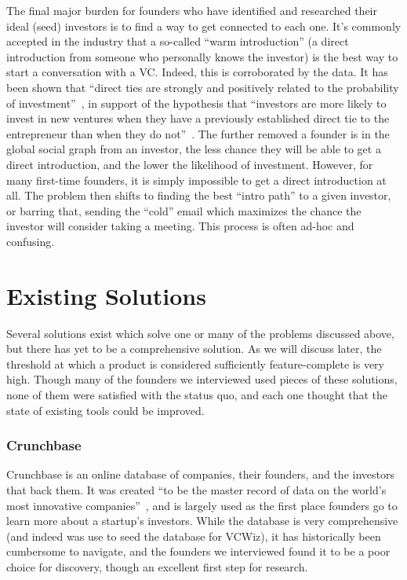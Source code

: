 The final major burden for founders who have identified and researched their ideal (seed) investors is to find a way to get connected to each one. It's commonly accepted in the industry that a so-called ``warm introduction'' (a direct introduction from someone who personally knows the investor) is the best way to start a conversation with a VC. Indeed, this is corroborated by the data. It has been shown that ``direct ties are strongly and positively related to the probability of investment''~\cite{doi:10.1287/mnsc.48.3.364.7731}, in support of the hypothesis that ``investors are more likely to invest in new ventures when they have a previously established direct tie to the entrepreneur than when they do not''~\cite{doi:10.1287/mnsc.48.3.364.7731}. The further removed a founder is in the global social graph from an investor, the less chance they will be able to get a direct introduction, and the lower the likelihood of investment. However, for many first-time founders, it is simply impossible to get a direct introduction at all. The problem then shifts to finding the best ``intro path'' to a given investor, or barring that, sending the ``cold'' email which maximizes the chance the investor will consider taking a meeting. This process is often ad-hoc and confusing.

\section{Existing Solutions}
\label{vcwiz:existing}

Several solutions exist which solve one or many of the problems discussed above, but there has yet to be a comprehensive solution. As we will discuss later, the threshold at which a product is considered sufficiently feature-complete is very high. Though many of the founders we interviewed used pieces of these solutions, none of them were satisfied with the status quo, and each one thought that the state of existing tools could be improved.

\subsubsection{Crunchbase}

Crunchbase is an online database of companies, their founders, and the investors that back them. It was created ``to be the master record of data on the world's most innovative companies''~\cite{doi:10.1287/mnsc.48.3.364.7731}, and is largely used as the first place founders go to learn more about a startup's investors. While the database is very comprehensive (and indeed was use to seed the database for VCWiz), it has historically been cumbersome to navigate, and the founders we interviewed found it to be a poor choice for discovery, though an excellent first step for research.

